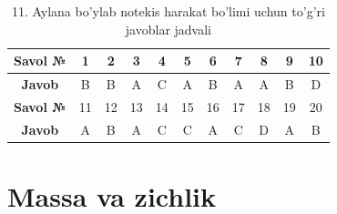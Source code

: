 \begin{table}[h!]
\centering
\caption{11. Aylana bo'ylab notekis harakat bo'limi uchun to'g'ri javoblar jadvali}
\begin{tabular}{|c|c|c|c|c|c|c|c|c|c|c|}
\hline
\textbf{Savol №} & 1 & 2 & 3 & 4 & 5 & 6 & 7 & 8 & 9 & 10 \\ \hline
\textbf{Javob}   & B & B & A & C & A & B & A & A & B & D \\ \hline
\hline
\textbf{Savol №} & 11 & 12 & 13 & 14 & 15 & 16 & 17 & 18 & 19 & 20 \\ \hline
\textbf{Javob}   & A & B & A & C & C & A & C & D & A & B \\ \hline
\end{tabular}
\end{table}








\section{Massa va zichlik}

